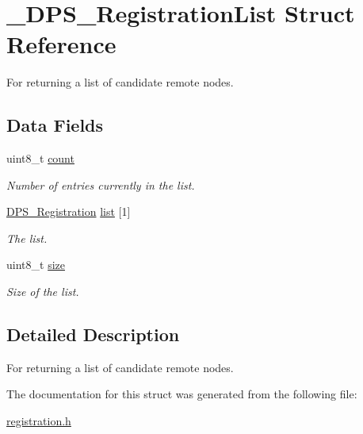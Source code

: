 \hypertarget{struct___d_p_s___registration_list}{}\section{\+\_\+\+D\+P\+S\+\_\+\+Registration\+List Struct Reference}
\label{struct___d_p_s___registration_list}


For returning a list of candidate remote nodes.  


\subsection*{Data Fields}
\begin{DoxyCompactItemize}
\item 
\mbox{\label{struct___d_p_s___registration_list_a3cf76d39d9ec5bee027f8dae52c1982d}} 
uint8\+\_\+t \hyperlink{struct___d_p_s___registration_list_a3cf76d39d9ec5bee027f8dae52c1982d}{count}
\begin{DoxyCompactList}\small\item\em Number of entries currently in the list. \end{DoxyCompactList}\item 
\mbox{\label{struct___d_p_s___registration_list_a7090074f00b35189ff64c21d5bc40535}} 
\hyperlink{group__registration_gac06db7e10b2626b06bacd09414e7d740}{D\+P\+S\+\_\+\+Registration} \hyperlink{struct___d_p_s___registration_list_a7090074f00b35189ff64c21d5bc40535}{list} \mbox{[}1\mbox{]}
\begin{DoxyCompactList}\small\item\em The list. \end{DoxyCompactList}\item 
\mbox{\label{struct___d_p_s___registration_list_a9aeb3177f17c29a6af6a702d3994b39d}} 
uint8\+\_\+t \hyperlink{struct___d_p_s___registration_list_a9aeb3177f17c29a6af6a702d3994b39d}{size}
\begin{DoxyCompactList}\small\item\em Size of the list. \end{DoxyCompactList}\end{DoxyCompactItemize}


\subsection{Detailed Description}
For returning a list of candidate remote nodes. 

The documentation for this struct was generated from the following file\+:\begin{DoxyCompactItemize}
\item 
\hyperlink{registration_8h}{registration.\+h}\end{DoxyCompactItemize}
